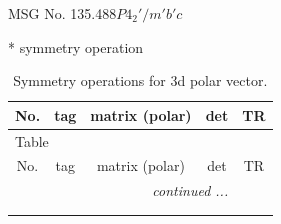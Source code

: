 \documentclass[fleqn,8pt]{jsarticle}
\begin{document}
\setcounter{MaxMatrixCols}{32}

\renewcommand{\tablename}{Table~}
\renewcommand{\figurename}{Figure~}
\begin{center}
\LARGE
MSG No. 135.488\quad$P4_{2}'/m'b'c$
\end{center}
* symmetry operation
\renewcommand{\arraystretch}{1.3}
\begin{longtable}{ccccc}
\caption{Symmetry operations for 3d polar vector.}
 \\
 \hline \hline
No. & tag & matrix (polar) & det & TR \\ \hline \endfirsthead

\multicolumn{4}{l}{\tablename\ \thetable{}} \\
 \hline \hline
No. & tag & matrix (polar) & det & TR \\ \hline \endhead

 \hline \hline
\multicolumn{4}{r}{\footnotesize\it continued ...} \\ \endfoot

 \hline \hline
\multicolumn{4}{r}{} \\ \endlastfoot


\end{longtable}
\end{document}

